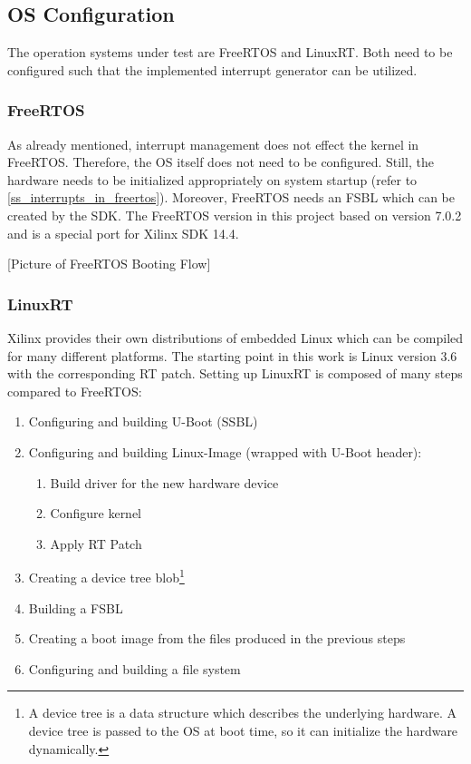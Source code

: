 \subsection{\ac{OS} Configuration}
The operation systems under test are FreeRTOS and LinuxRT.
Both need to be configured such that the implemented interrupt generator can be utilized.

\subsubsection{FreeRTOS}
As already mentioned, interrupt management does not effect the kernel in FreeRTOS.
Therefore, the \ac{OS} itself does not need to be configured.
Still, the hardware needs to be initialized appropriately on system startup (refer to \ref{ss_interrupts_in_freertos}). 
Moreover, FreeRTOS needs an \ac{FSBL} which can be created by the \ac{SDK}.
The FreeRTOS version in this project based on version 7.0.2 and is a special port for Xilinx \ac{SDK} 14.4.

[Picture of FreeRTOS Booting Flow]
\subsubsection{LinuxRT}
Xilinx provides their own distributions of embedded Linux which can be compiled for many different platforms. 
The starting point in this work is Linux version 3.6 with the corresponding RT patch.
Setting up LinuxRT is composed of many steps compared to FreeRTOS:
\begin{enumerate}
	\item Configuring and building U-Boot (\ac{SSBL})
	\item Configuring and building Linux-Image (wrapped with U-Boot header):
		\begin{enumerate}
			\item Build driver for the new hardware device
			\item Configure kernel
			\item Apply RT Patch
		\end{enumerate}
	\item Creating a device tree blob\footnote{A device tree is a data structure which describes the underlying hardware. A device tree is passed to the \ac{OS} at boot time, so it can initialize the hardware dynamically.\cite{device_tree}}
	\item Building a \ac{FSBL}
	\item Creating a boot image from the files produced in the previous steps
	\item Configuring and building a file system
\end{enumerate}

